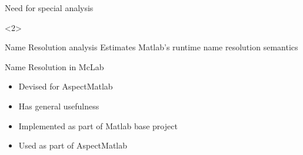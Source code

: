 \begin{frame}{Need for special analysis}
  \begin{onlyenv}<2>
    \begin{block}{Name Resolution analysis}
      Estimates Matlab's runtime name resolution semantics
    \end{block}
  \end{onlyenv}
\end{frame}
\begin{frame}{Name Resolution in McLab}
  \begin{itemize}
  \item Devised for AspectMatlab
  \item Has general usefulness
  \item Implemented as part of Matlab base project
  \item Used as part of AspectMatlab
  \end{itemize}
\end{frame}